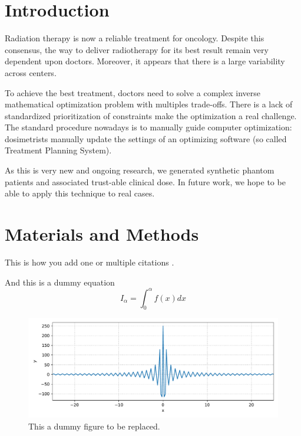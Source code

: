 \section{Introduction}

Radiation therapy is now a reliable treatment for oncology.
Despite this consensus, the way to deliver radiotherapy for its best result remain very dependent upon doctors.
Moreover, it appears that there is a large variability across centers.

To achieve the best treatment, doctors need to solve a complex inverse mathematical optimization problem with multiples trade-offs.
There is a lack of standardized prioritization of constraints make the optimization a real challenge.
The standard procedure nowadays is to manually guide computer optimization: dosimetrists manually update the settings of an optimizing software (so called Treatment Planning System).


As this is very new and ongoing research, we generated synthetic phantom patients and associated trust-able clinical dose.
In future work, we hope to be able to apply this technique to real cases.

\section{Materials and Methods}

This is how you add one \cite{Pivot2023} or multiple citations \cite{Saporta2022,Robert2022}.

And this is a dummy equation
\begin{equation}
I_\alpha = \int_0^\alpha f(x) dx
\end{equation}

\begin{figure}
  \centering
  \includegraphics[width=1.0\textwidth]{./fig1.pdf}
  \caption{This a dummy figure to be replaced.}
  \label{fig:dummyfigure}
\end{figure}

